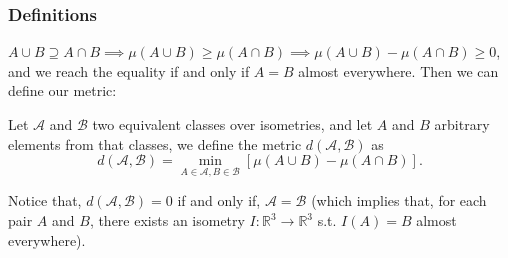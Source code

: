 \documentclass[aspectratio=169]{beamer}\usepackage[utf8]{inputenc}
\newcommand{\R}{\mathbb{R}}
\begin{document}
\begin{frame}\frametitle{Definitions}

$A\cup B\supseteq A\cap B\implies \mu(A\cup B)\geq\mu(A\cap B)\implies\mu(A\cup B)-\mu(A\cap B)\geq0$, and we reach the equality if and only if $A=B$ almost everywhere. Then we can define our metric:

\begin{definition}
Let $\mathcal{A}$ and $\mathcal{B}$ two equivalent classes over isometries, and let $A$ and $B$ arbitrary elements from that classes, we define the metric $d(\mathcal{A},\mathcal{B})$ as
\begin{equation}
d(\mathcal{A},\mathcal{B})=\min_{A\in\mathcal{A},B\in\mathcal{B}}\left[\mu(A\cup B)-\mu(A\cap B)\right].
\end{equation}
\end{definition}
Notice that, $d(\mathcal{A},\mathcal{B})=0$ if and only if, $\mathcal{A}=\mathcal{B}$ (which implies that, for each pair $A$ and $B$, there exists an isometry $I:\R^3\to\R^3$ s.t. $I(A)=B$ almost everywhere).

\end{frame}


%
%
%
%
%
\end{document}
